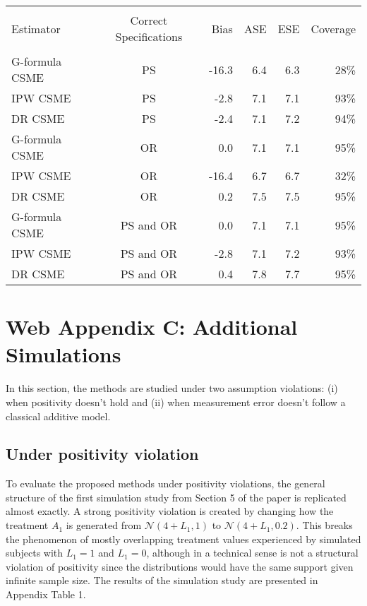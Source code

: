 \documentclass[12pt]{article}
\newcounter{tblcap}
\def\tblhead#1{\hline\\[-9pt]#1\\\hline\\[-9.75pt]}
\def\lastline{\\\hline}
\begin{document}
\begin{table}[h]
{\tabcolsep=6.25pt
\begin{tabular}{@{}lcrrrr@{}}
\tblhead{Estimator & Correct Specifications & Bias & ASE & ESE & Coverage}
G-formula CSME & PS & -16.3 & 6.4 & 6.3 & 28\% \\
IPW CSME & PS & -2.8 & 7.1 & 7.1 & 93\% \\
DR CSME & PS & -2.4 & 7.1 & 7.2 & 94\% \\[3pt]
G-formula CSME & OR & 0.0 & 7.1 & 7.1 & 95\% \\
IPW CSME & OR & -16.4 & 6.7 & 6.7 & 32\% \\
DR CSME & OR & 0.2 & 7.5 & 7.5 & 95\% \\[3pt]
G-formula CSME & PS and OR & 0.0 & 7.1 & 7.1 & 95\% \\
IPW CSME & PS and OR & -2.8 & 7.1 & 7.2 & 93\% \\
DR CSME & PS and OR & 0.4 & 7.8 & 7.7 & 95\%
\lastline
\end{tabular}}
\end{table}

\section{Web Appendix C: Additional Simulations}

In this section, the methods are studied under two assumption violations: (i) when positivity doesn't hold and (ii) when measurement error doesn't follow a classical additive model.

\subsection{Under positivity violation}

To evaluate the proposed methods under positivity violations, the general structure of the first simulation study from Section 5 of the paper is replicated almost exactly. A strong positivity violation is created by changing how the treatment $A_{1}$ is generated from $\mathcal{N}(4 + L_{1}, 1)$ to $\mathcal{N}(4 + L_{1}, 0.2)$. This breaks the phenomenon of mostly overlapping treatment values experienced by simulated subjects with $L_{1} = 1$ and $L_{1} = 0$, although in a technical sense is not a structural violation of positivity since the distributions would have the same support given infinite sample size. The results of the simulation study are presented in Appendix Table 1.
\end{document}
